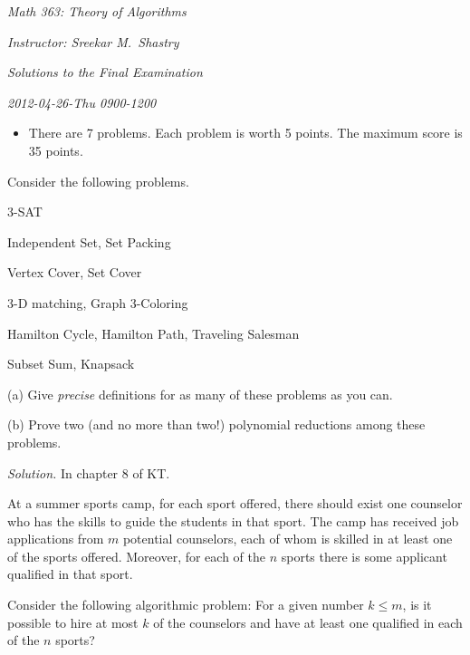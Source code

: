 \documentclass[10pt,reqno]{amsart}
\begin{document}
\noindent \textit{Math 363: Theory of Algorithms}

\noindent \textit{Instructor: Sreekar M.~Shastry}

\noindent \textit{Solutions to the Final Examination}

\noindent \textit{2012-04-26-Thu 0900-1200}

\medskip

\begin{itemize}
    \item There are 7 problems. Each problem is worth 5 points. The
        maximum score is 35 points.

\end{itemize}

\medskip

\begin{outline}[enumerate]

\1 Consider the following problems.

\medskip

3-SAT

Independent Set, Set Packing

Vertex Cover, Set Cover

3-D matching, Graph 3-Coloring

Hamilton Cycle, Hamilton Path, Traveling Salesman

Subset Sum, Knapsack

\medskip

(a) Give \emph{precise} definitions for as many of these problems as you can.

(b) Prove two (and no more than two!) polynomial reductions among these
problems.

\medskip
\noindent \emph{Solution.} In chapter 8 of KT.
\medskip

%
%
%

\1 At a summer sports camp, for each sport offered, there should exist one
counselor who has the skills to guide the students in that sport. The camp has
received job applications from $m$ potential counselors, each of whom is
skilled in at least one of the sports offered. Moreover, for each of the $n$
sports there is some applicant qualified in that sport.

Consider the following algorithmic problem: For a given number $k \le m$, is it
possible to hire at most $k$ of the counselors and have at least one qualified
in each of the $n$ sports?


\end{outline}
\end{document}
